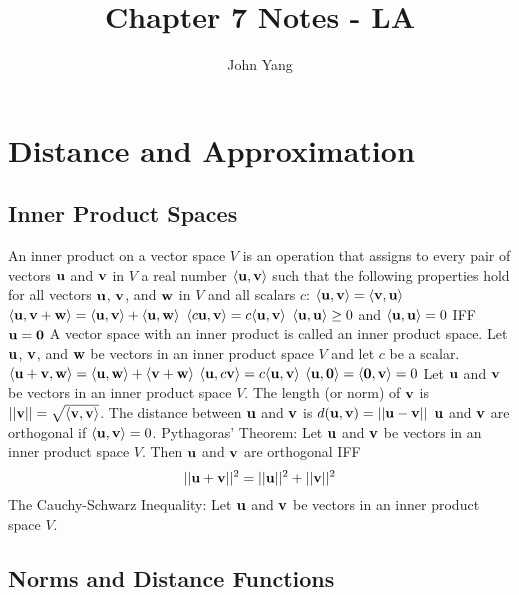 \documentclass{article}
\title{Chapter 7 Notes - LA} %
\author{John Yang}
\begin{document}
    \maketitle
    \tableofcontents
    \section{Distance and Approximation} %
    \subsection{Inner Product Spaces} 
    \begin{outline}
        \1 An inner product on a vector space $V$ is an operation that assigns to every pair of vectors \(\vb u\) and \(\vb v\) in $V$ a real number \(\langle\vb u,\vb v\rangle\) such that the following properties hold for all vectors \(\vb u\), \(\vb v\), and \(\vb w\) in $V$ and all scalars $c$:
            \2 \(\langle\vb u,\vb v\rangle=\langle\vb v,\vb u\rangle\)
            \2 \(\langle\vb u,\vb v+\vb w\rangle=\langle\vb u,\vb v\rangle+\langle\vb u,\vb w\rangle\)
            \2 \(\langle c\vb u,\vb v\rangle=c\langle\vb u,\vb v\rangle\)
            \2 \(\langle\vb u,\vb u\rangle\geq 0\) and \(\langle\vb u,\vb u\rangle=0\) IFF \(\vb u=\vb 0\)
        \1 A vector space with an inner product is called an inner product space. 
        \1 Let \(\vb u\), \(\vb v\), and \(\vb w\) be vectors in an inner product space $V$ and let \(c\) be a scalar. 
            \2 \(\langle\vb u+\vb v,\vb w\rangle=\langle\vb u,\vb w\rangle+\langle\vb v+\vb w\rangle\)
            \2 \(\langle\vb u,c\vb v\rangle=c\langle\vb u,\vb v\rangle\)
            \2 \(\langle\vb u,\vb 0\rangle=\langle\vb 0,\vb v\rangle=0\)
        \1 Let \(\vb u\) and \(\vb v\) be vectors in an inner product space $V$. 
            \2 The length (or norm) of \(\vb v\) is \(||\vb v||=\sqrt{\langle\vb v,\vb v\rangle}\). 
            \2 The distance between \(\vb u\) and \(\vb v\) is \(d(\vb u,\vb v)=||\vb u-\vb v||\)
            \2 \(\vb u\) and \(\vb v\) are orthogonal if \(\langle\vb u,\vb v\rangle=0\). 
        \1 Pythagoras' Theorem: Let \(\vb u\) and \(\vb v\) be vectors in an inner product space $V$. Then \(\vb u\) and \(\vb v\) are orthogonal IFF \[||\vb u+\vb v||^2=||\vb u||^2+||\vb v||^2\]
        \1 The Cauchy-Schwarz Inequality: Let \(\vb u\) and \(\vb v\) be vectors in an inner product space $V$. 
    \end{outline}
    \subsection{Norms and Distance Functions} 
    \begin{outline}
        \1 
    \end{outline}
\end{document}
